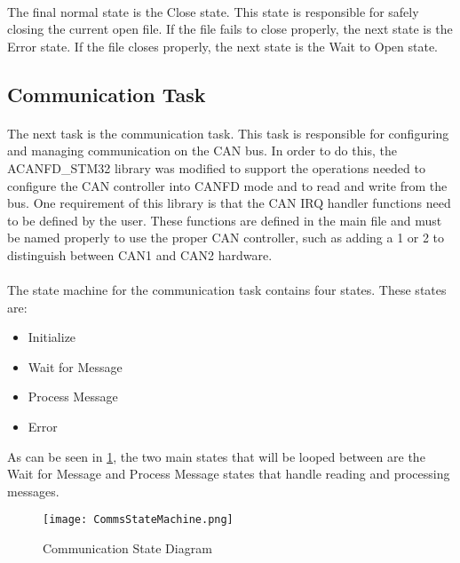 \paragraph{}
The final normal state is the Close state.
This state is responsible for safely closing the current open file.
If the file fails to close properly, the next state is the Error state.
If the file closes properly, the next state is the Wait to Open state.

\subsection{Communication Task}

\paragraph{}
The next task is the communication task.
This task is responsible for configuring and managing communication on the CAN bus.
In order to do this, the ACANFD\_STM32 library \cite{ACANFDGithub} was modified to support the operations needed to configure the CAN controller into CANFD mode and to read and write from the bus.
One requirement of this library is that the CAN IRQ handler functions need to be defined by the user.
These functions are defined in the main file and must be named properly to use the proper CAN controller, such as adding a 1 or 2 to distinguish between CAN1 and CAN2 hardware.

\paragraph{}
The state machine for the communication task contains four states.
These states are:
\begin{itemize}
	\item Initialize
	\item Wait for Message
	\item Process Message
	\item Error
\end{itemize}
As can be seen in \cref{fig:CommsDiagram}, the two main states that will be looped between are the Wait for Message and Process Message states that handle reading and processing messages.

\begin{figure}[H]
	\centering
	\texttt{[image: CommsStateMachine.png]}
	\caption{Communication State Diagram}
	\label{fig:CommsDiagram}
\end{figure}

